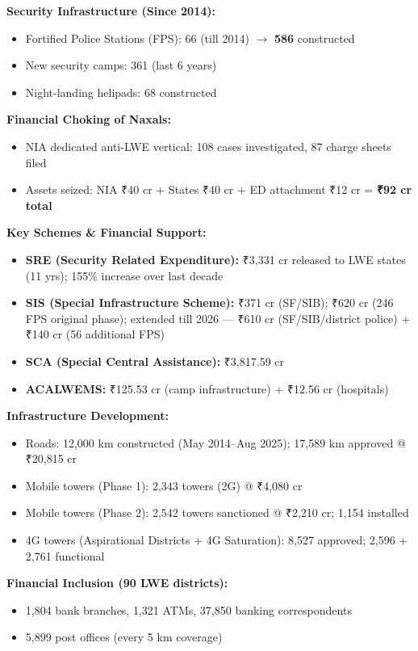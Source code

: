 \textbf{Security Infrastructure (Since 2014):}
\begin{itemize}
  \item Fortified Police Stations (FPS): 66 (till 2014) $\to$ \textbf{586} constructed
  \item New security camps: 361 (last 6 years)
  \item Night-landing helipads: 68 constructed
\end{itemize}

\textbf{Financial Choking of Naxals:}
\begin{itemize}
  \item NIA dedicated anti-LWE vertical: 108 cases investigated, 87 charge sheets filed
  \item Assets seized: NIA ₹40 cr + States ₹40 cr + ED attachment ₹12 cr = \textbf{₹92 cr total}
\end{itemize}

\textbf{Key Schemes \& Financial Support:}
\begin{itemize}
  \item \textbf{SRE (Security Related Expenditure):} ₹3,331 cr released to LWE states (11 yrs); 155\% increase over last decade
  \item \textbf{SIS (Special Infrastructure Scheme):} ₹371 cr (SF/SIB); ₹620 cr (246 FPS original phase); extended till 2026 — ₹610 cr (SF/SIB/district police) + ₹140 cr (56 additional FPS)
  \item \textbf{SCA (Special Central Assistance):} ₹3,817.59 cr
  \item \textbf{ACALWEMS:} ₹125.53 cr (camp infrastructure) + ₹12.56 cr (hospitals)
\end{itemize}

\textbf{Infrastructure Development:}
\begin{itemize}
  \item Roads: 12,000 km constructed (May 2014–Aug 2025); 17,589 km approved @ ₹20,815 cr
  \item Mobile towers (Phase 1): 2,343 towers (2G) @ ₹4,080 cr
  \item Mobile towers (Phase 2): 2,542 towers sanctioned @ ₹2,210 cr; 1,154 installed
  \item 4G towers (Aspirational Districts + 4G Saturation): 8,527 approved; 2,596 + 2,761 functional
\end{itemize}

\textbf{Financial Inclusion (90 LWE districts):}
\begin{itemize}
  \item 1,804 bank branches, 1,321 ATMs, 37,850 banking correspondents
  \item 5,899 post offices (every 5 km coverage)
\end{itemize}

